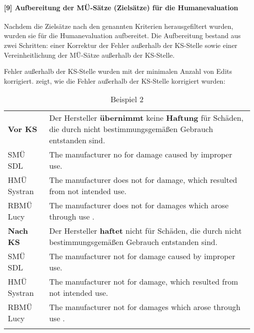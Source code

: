 \paragraph*{[9] Aufbereitung der MÜ-Sätze (Zielsätze) für die Humanevaluation}

Nachdem die Zielsätze nach den genannten Kriterien herausgefiltert wurden, wurden sie für die Humanevaluation aufbereitet. Die Aufbereitung bestand aus zwei Schritten: einer Korrektur der Fehler außerhalb der KS-Stelle sowie einer Vereinheitlichung der MÜ-Sätze außerhalb der KS-Stelle.

Fehler außerhalb der KS-Stelle wurden mit der minimalen Anzahl von Edits korrigiert.  zeigt, wie die Fehler außerhalb der KS-Stelle korrigiert wurden:


\begin{table}
    \begin{tabularx}{\textwidth}{lQ}
\lsptoprule
\textbf{Vor KS} & Der Hersteller \textbf{übernimmt} keine \textbf{Haftung} für Schäden, die durch nicht bestimmungsgemäßen Gebrauch entstanden sind. \\
\tablevspace
SMÜ SDL & The manufacturer  no  for damage caused by improper use.\\
HMÜ Systran & The manufacturer does not   for damage, which resulted from not intended use.\\
RBMÜ Lucy & The manufacturer does not   for damages which arose through use .\\
\midrule
\textbf{Nach KS} & Der Hersteller \textbf{haftet} nicht für Schäden, die durch nicht bestimmungsgemäßen Gebrauch entstanden sind.\\
\tablevspace
SMÜ SDL & The manufacturer  not  for damage caused by improper use.\\
HMÜ Systran & The manufacturer  not  for damage, which resulted from not intended use.\\
RBMÜ Lucy & The manufacturer  not  for damages which arose through use .\\
\lspbottomrule
    \end{tabularx}
    \caption{Beispiel 2}
    \label{tabex:2}

\end{table}

